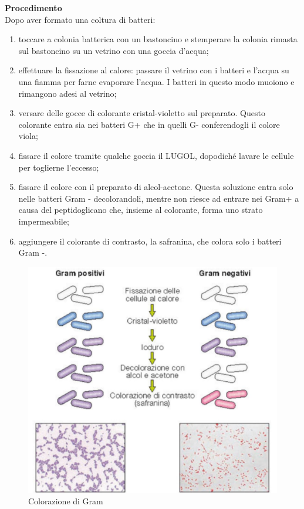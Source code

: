\documentclass[11pt]{book}
\begin{document}
\textbf{Procedimento}\\
Dopo aver formato una coltura di batteri:
\begin{enumerate}
\item toccare a colonia batterica con un bastoncino e stemperare la colonia rimasta sul bastoncino su un vetrino con una goccia d’acqua;
\item effettuare la fissazione al calore: passare il vetrino con i batteri e l’acqua su una fiamma per farne evaporare l’acqua. I batteri in questo modo muoiono e rimangono adesi al vetrino;
\item versare delle gocce di colorante cristal-violetto sul preparato. Questo colorante entra sia nei batteri G+ che in quelli G- conferendogli il colore viola;
\item fissare il colore tramite qualche goccia il LUGOL, dopodiché lavare le cellule per toglierne l’eccesso;
\item fissare il colore con il preparato di alcol-acetone. Questa soluzione entra solo nelle batteri Gram - decolorandoli, mentre non riesce ad entrare nei Gram+ a causa del peptidoglicano che, insieme al colorante, forma uno strato impermeabile;
\item aggiungere il colorante di contrasto, la safranina, che colora solo i batteri Gram -.
\end{enumerate}

\begin{figure}[htp]
\centering
\includegraphics[scale=0.5]{img/Colorazione di Gram.png}
\caption{Colorazione di Gram}
\label{}
\end{figure}
\end{document}
